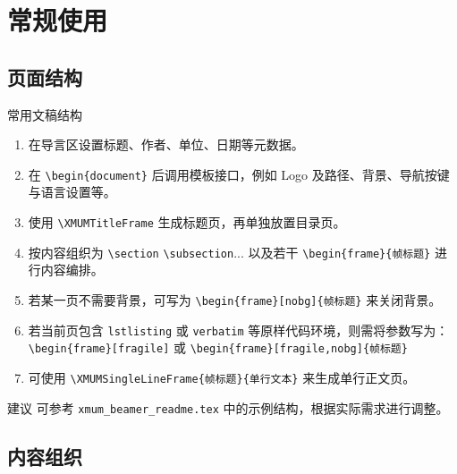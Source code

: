 \documentclass[aspectratio=169,11pt]{ctexbeamer}
\begin{document}
\section{常规使用}

\subsection{页面结构}

\begin{frame}{常用文稿结构}
    \begin{enumerate}
        \item 在导言区设置标题、作者、单位、日期等元数据。
        \item 在 \texttt{\textbackslash begin\{document\}} 后调用模板接口，例如 Logo 及路径、背景、导航按键与语言设置等。
        \item 使用 \texttt{\textbackslash XMUMTitleFrame} 生成标题页，再单独放置目录页。
        \item 按内容组织为 \texttt{\textbackslash section} \texttt{\textbackslash subsection}... 以及若干 \texttt{\textbackslash begin\{frame\}\{帧标题\}} 进行内容编排。
        \item 若某一页不需要背景，可写为 \texttt{\textbackslash begin\{frame\}[nobg]\{帧标题\}} 来关闭背景。
        \item 若当前页包含 \texttt{lstlisting} 或 \texttt{verbatim} 等原样代码环境，则需将参数写为：\texttt{\textbackslash begin\{frame\}[fragile]} 或 \texttt{\textbackslash begin\{frame\}[fragile,nobg]\{帧标题\}}
        \item 可使用 \texttt{\textbackslash XMUMSingleLineFrame\{帧标题\}\{单行文本\}} 来生成单行正文页。
    \end{enumerate}

    \begin{block}{建议}
        可参考 \texttt{xmum\_beamer\_readme.tex} 中的示例结构，根据实际需求进行调整。
    \end{block}
\end{frame}

\subsection{内容组织}
\end{document}
